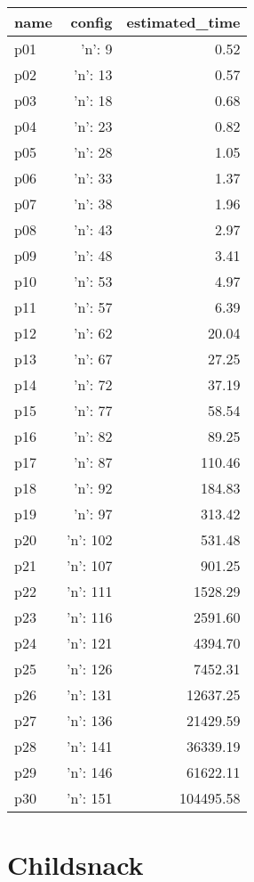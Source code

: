 \documentclass{article}
\begin{document}
                            \begin{center}
                            \scriptsize
                            \begin{tabular}{@{}l|r|r@{}}
                            name & config & estimated\_time\\\midrule
                              p01&{'n': 9}&0.52\\
  p02&{'n': 13}&0.57\\
  p03&{'n': 18}&0.68\\
  p04&{'n': 23}&0.82\\
  p05&{'n': 28}&1.05\\
  p06&{'n': 33}&1.37\\
  p07&{'n': 38}&1.96\\
  p08&{'n': 43}&2.97\\
  p09&{'n': 48}&3.41\\
  p10&{'n': 53}&4.97\\
  p11&{'n': 57}&6.39\\
  p12&{'n': 62}&20.04\\
  p13&{'n': 67}&27.25\\
  p14&{'n': 72}&37.19\\
  p15&{'n': 77}&58.54\\
  p16&{'n': 82}&89.25\\
  p17&{'n': 87}&110.46\\
  p18&{'n': 92}&184.83\\
  p19&{'n': 97}&313.42\\
  p20&{'n': 102}&531.48\\
  p21&{'n': 107}&901.25\\
  p22&{'n': 111}&1528.29\\
  p23&{'n': 116}&2591.60\\
  p24&{'n': 121}&4394.70\\
  p25&{'n': 126}&7452.31\\
  p26&{'n': 131}&12637.25\\
  p27&{'n': 136}&21429.59\\
  p28&{'n': 141}&36339.19\\
  p29&{'n': 146}&61622.11\\
  p30&{'n': 151}&104495.58
                            \end{tabular}
                            \end{center}
                    
                            \newpage \section{Childsnack}
\end{document}
